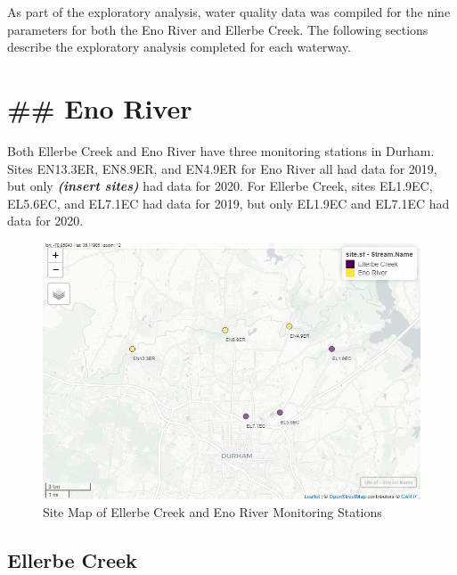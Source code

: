 \documentclass[
  12pt,
]{article}
\begin{document}
As part of the exploratory analysis, water quality data was compiled for
the nine parameters for both the Eno River and Ellerbe Creek. The
following sections describe the exploratory analysis completed for each
waterway.

\hypertarget{eno-river}{%
\section{\#\# Eno River}\label{eno-river}}

Both Ellerbe Creek and Eno River have three monitoring stations in
Durham. Sites EN13.3ER, EN8.9ER, and EN4.9ER for Eno River all had data
for 2019, but only \textbf{\emph{(insert sites)}} had data for 2020. For
Ellerbe Creek, sites EL1.9EC, EL5.6EC, and EL7.1EC had data for 2019,
but only EL1.9EC and EL7.1EC had data for 2020.

\begin{figure}

{\centering \includegraphics[width=1\linewidth]{SiteMap} 

}

\caption{Site Map of Ellerbe Creek and Eno River Monitoring Stations}\label{fig:unnamed-chunk-1}
\end{figure}

\hypertarget{ellerbe-creek}{%
\subsection{Ellerbe Creek}\label{ellerbe-creek}}
\end{document}
